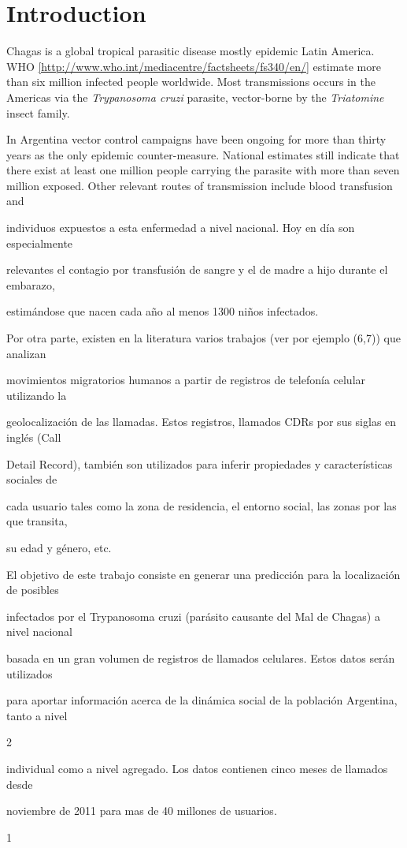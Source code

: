 \section{Introduction}

Chagas is a global tropical parasitic disease mostly epidemic Latin America. WHO \ref{http://www.who.int/mediacentre/factsheets/fs340/en/} estimate more than six million infected people worldwide. Most transmissions occurs in the Americas via the \textit{Trypanosoma cruzi} parasite, vector-borne by the \textit{Triatomine} insect family.

In Argentina vector control campaigns have been ongoing for more than thirty years as the only epidemic counter-measure. National estimates still indicate that there exist at least one million people carrying the parasite with more than seven million exposed.
Other relevant routes of transmission include blood transfusion and 

individuos expuestos a esta enfermedad a nivel nacional. Hoy en día son especialmente

relevantes el contagio por transfusión de sangre y el de madre a hijo durante el embarazo,

estimándose que nacen cada año al menos 1300 niños infectados.

Por otra parte, existen en la literatura varios trabajos (ver por ejemplo (6,7)) que analizan

movimientos migratorios humanos a partir de registros de telefonía celular utilizando la

geolocalización de las llamadas. Estos registros, llamados CDRs por sus siglas en inglés (Call

Detail Record), también son utilizados para inferir propiedades y características sociales de

cada usuario tales como la zona de residencia, el entorno social, las zonas por las que transita,

su edad y género, etc.

El objetivo de este trabajo consiste en generar una predicción para la localización de posibles

infectados por el Trypanosoma cruzi (parásito causante del Mal de Chagas) a nivel nacional

basada en un gran volumen de registros de llamados celulares. Estos datos serán utilizados

para aportar información acerca de la dinámica social de la población Argentina, tanto a nivel

2

individual como a nivel agregado. Los datos contienen cinco meses de llamados desde

noviembre de 2011 para mas de 40 millones de usuarios.

1